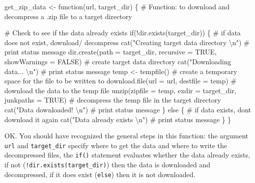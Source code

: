 \documentclass[
  letterpaper,
]{latex/krantz}
\newenvironment{Shaded}{\begin{snugshade}}{\end{snugshade}}
\newcommand{\AttributeTok}[1]{\textcolor[rgb]{0.40,0.45,0.13}{#1}}
\newcommand{\CommentTok}[1]{\textcolor[rgb]{0.37,0.37,0.37}{#1}}
\newcommand{\ConstantTok}[1]{\textcolor[rgb]{0.56,0.35,0.01}{#1}}
\newcommand{\ControlFlowTok}[1]{\textcolor[rgb]{0.00,0.23,0.31}{#1}}
\newcommand{\FunctionTok}[1]{\textcolor[rgb]{0.28,0.35,0.67}{#1}}
\newcommand{\NormalTok}[1]{\textcolor[rgb]{0.00,0.23,0.31}{#1}}
\newcommand{\OtherTok}[1]{\textcolor[rgb]{0.00,0.23,0.31}{#1}}
\newcommand{\SpecialCharTok}[1]{\textcolor[rgb]{0.37,0.37,0.37}{#1}}
\newcommand{\StringTok}[1]{\textcolor[rgb]{0.13,0.47,0.30}{#1}}
\begin{document}
\begin{Shaded}
\begin{Highlighting}[]
\NormalTok{get\_zip\_data }\OtherTok{\textless{}{-}} \ControlFlowTok{function}\NormalTok{(url, target\_dir) \{}
  \CommentTok{\# Function: to download and decompress a .zip file to a target directory}
  
  \CommentTok{\# Check to see if the data already exists}
  \ControlFlowTok{if}\NormalTok{(}\SpecialCharTok{!}\FunctionTok{dir.exists}\NormalTok{(target\_dir)) \{ }\CommentTok{\# if data does not exist, download/ decompress}
    \FunctionTok{cat}\NormalTok{(}\StringTok{"Creating target data directory }\SpecialCharTok{\textbackslash{}n}\StringTok{"}\NormalTok{) }\CommentTok{\# print status message}
    \FunctionTok{dir.create}\NormalTok{(}\AttributeTok{path =}\NormalTok{ target\_dir, }\AttributeTok{recursive =} \ConstantTok{TRUE}\NormalTok{, }\AttributeTok{showWarnings =} \ConstantTok{FALSE}\NormalTok{) }\CommentTok{\# create target data directory}
    \FunctionTok{cat}\NormalTok{(}\StringTok{"Downloading data... }\SpecialCharTok{\textbackslash{}n}\StringTok{"}\NormalTok{) }\CommentTok{\# print status message}
\NormalTok{    temp }\OtherTok{\textless{}{-}} \FunctionTok{tempfile}\NormalTok{() }\CommentTok{\# create a temporary space for the file to be written to}
    \FunctionTok{download.file}\NormalTok{(}\AttributeTok{url =}\NormalTok{ url, }\AttributeTok{destfile =}\NormalTok{ temp) }\CommentTok{\# download the data to the temp file}
    \FunctionTok{unzip}\NormalTok{(}\AttributeTok{zipfile =}\NormalTok{ temp, }\AttributeTok{exdir =}\NormalTok{ target\_dir, }\AttributeTok{junkpaths =} \ConstantTok{TRUE}\NormalTok{) }\CommentTok{\# decompress the temp file in the target directory}
    \FunctionTok{cat}\NormalTok{(}\StringTok{"Data downloaded! }\SpecialCharTok{\textbackslash{}n}\StringTok{"}\NormalTok{) }\CommentTok{\# print status message}
\NormalTok{  \} }\ControlFlowTok{else}\NormalTok{ \{ }\CommentTok{\# if data exists, don\textquotesingle{}t download it again}
    \FunctionTok{cat}\NormalTok{(}\StringTok{"Data already exists }\SpecialCharTok{\textbackslash{}n}\StringTok{"}\NormalTok{) }\CommentTok{\# print status message}
\NormalTok{  \}}
\NormalTok{\}}
\end{Highlighting}
\end{Shaded}

OK. You should have recognized the general steps in this function: the
argument \texttt{url} and \texttt{target\_dir} specify where to get the
data and where to write the decompressed files, the \texttt{if()}
statement evaluates whether the data already exists, if not
(\texttt{!dir.exists(target\_dir)}) then the data is downloaded and
decompressed, if it does exist (\texttt{else}) then it is not
downloaded.
\end{document}
